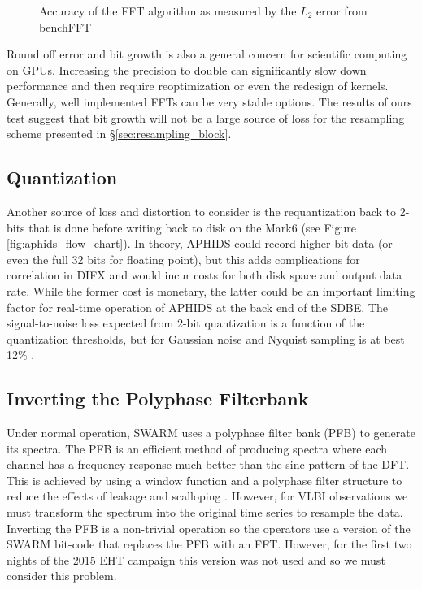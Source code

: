 \documentclass[11pt,preprint]{aastex}
\begin{document}
\begin{figure}[H!]
\caption{Accuracy of the FFT algorithm as measured by the $L_2$ error from benchFFT} \label{fig:fft_accuracy}
\end{figure}

Round off error and bit growth is also a general concern for scientific computing on GPUs.  
Increasing the precision to double can significantly slow down performance and then 
require reoptimization or even the redesign of kernels.  Generally, well implemented FFTs can 
be very stable options.  The results of ours test suggest that 
bit growth will not be a large source of loss for the resampling scheme presented in \S\ref{sec:resampling_block}.

\subsection{Quantization}
Another source of loss and distortion to consider is the requantization back to 2-bits that is done
before writing back to disk on the Mark6 (see Figure \ref{fig:aphids_flow_chart}).  In theory, APHIDS could 
record higher bit data (or even the full 32 bits for floating point), but this adds complications for 
correlation 
in DIFX and would incur costs for both disk space and output data rate.  While the former cost is monetary, the 
latter could be an important limiting factor for real-time operation of APHIDS at the back end of the SDBE.  
The signal-to-noise loss expected from 2-bit quantization is a function of the quantization 
thresholds, but for Gaussian noise and Nyquist sampling is at best 12\% \citep{cooper70,thompson01}.

\subsection{Inverting the Polyphase Filterbank}
Under normal operation, SWARM uses a polyphase filter bank (PFB) to generate its spectra.  The PFB is an 
efficient method of producing spectra where each channel has a frequency response much better than the 
sinc pattern of the DFT.  This is achieved by using a window function and a polyphase filter structure to reduce 
the effects of leakage and scalloping \citep{lyons11}.  However, for VLBI observations we must transform the 
spectrum into the original time series to resample the data.  Inverting the PFB is a non-trivial operation so 
the operators use a version of the SWARM bit-code that replaces the PFB with an FFT.  However, for the first 
two nights of the 2015 EHT campaign this version was not used and so we must consider this problem.
\end{document}
